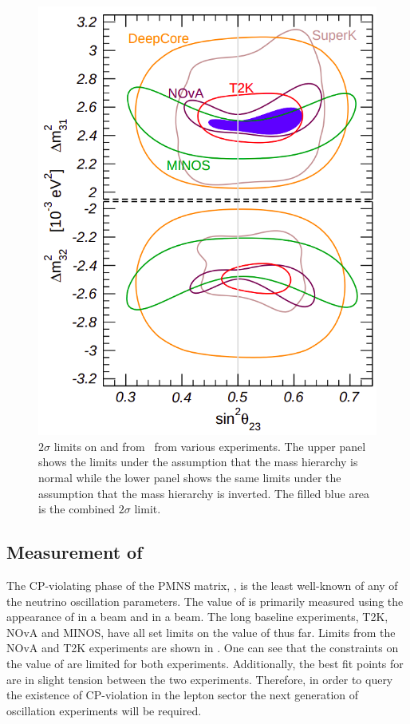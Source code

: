 \begin{figure}[h]
  \centering
  \includegraphics[width=.5\linewidth]{files/figures/theory/theta23Deltam}
  \caption[Experimental limits on  and .]{$2\sigma$ limits on  and  from~\cite{nufit4} from various experiments. The upper panel shows the limits under the assumption that the mass hierarchy is normal while the lower panel shows the same limits under the assumption that the mass hierarchy is inverted. The filled blue area is the combined $2\sigma$ limit.}
  \label{fig:theta23deltam}
\end{figure}

\subsection{Measurement of \dcp}
\label{sec:theory:currentState:dcp}

The CP-violating phase of the PMNS matrix, \dcp, is the least well-known of any of the neutrino oscillation parameters.
The value of \dcp is primarily measured using the appearance of \nue in a \numu beam and \anue in a \anumu beam.
The long baseline experiments, T2K, NOvA and MINOS, have all set limits on the value of \dcp thus far.
Limits from the NOvA and T2K experiments are shown in .
One can see that the constraints on the value of \dcp are limited for both experiments.
Additionally, the best fit points for \dcp are in slight tension between the two experiments.
Therefore, in order to query the existence of CP-violation in the lepton sector the next generation of oscillation experiments will be required.

